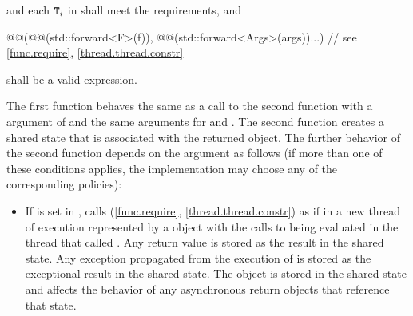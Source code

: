 \begin{itemdescr}
\pnum
\requires {} and each $\texttt{T}_i$ in  shall
meet the
 requirements, and
\begin{codeblock}
@@(@@(std::forward<F>(f)),
       @@(std::forward<Args>(args))...)     // see \ref{func.require}, \ref{thread.thread.constr}
\end{codeblock}
shall be a valid expression.

\pnum
\effects
The first function
behaves the same as a call to the second function with a  argument of
and the same arguments for  and .
The second function creates a shared state that is associated with
the returned  object.
The further behavior
of the second function depends on the  argument as follows (if
more than one of these conditions applies, the implementation may choose any of
the corresponding policies):

\begin{itemize}
\item
If  is set in , calls
(\ref{func.require}, \ref{thread.thread.constr})
as if in a new thread of execution represented by a  object
with the calls to  being evaluated in the thread that called .
Any return value
is stored as the result in the
shared state. Any exception propagated from
the execution of
is stored as the exceptional result in the shared state.
The  object is
stored in the shared state
and affects the behavior of any asynchronous return objects that
reference that state.


\end{itemize}
\end{itemdescr}
